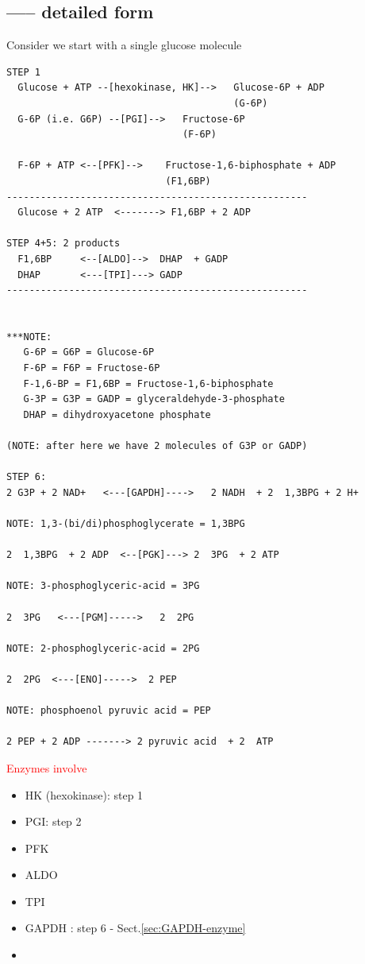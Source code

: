 

\subsection{----- detailed form}

Consider we start with a single glucose molecule

{\tiny
\begin{verbatim}
STEP 1
  Glucose + ATP --[hexokinase, HK]-->   Glucose-6P + ADP
                                        (G-6P)
  G-6P (i.e. G6P) --[PGI]-->   Fructose-6P
                               (F-6P)

  F-6P + ATP <--[PFK]-->    Fructose-1,6-biphosphate + ADP
                            (F1,6BP)
-----------------------------------------------------
  Glucose + 2 ATP  <-------> F1,6BP + 2 ADP

STEP 4+5: 2 products
  F1,6BP     <--[ALDO]-->  DHAP  + GADP
  DHAP       <---[TPI]---> GADP
-----------------------------------------------------


***NOTE:
   G-6P = G6P = Glucose-6P
   F-6P = F6P = Fructose-6P
   F-1,6-BP = F1,6BP = Fructose-1,6-biphosphate
   G-3P = G3P = GADP = glyceraldehyde-3-phosphate
   DHAP = dihydroxyacetone phosphate

(NOTE: after here we have 2 molecules of G3P or GADP)

STEP 6:
2 G3P + 2 NAD+   <---[GAPDH]---->   2 NADH  + 2  1,3BPG + 2 H+

NOTE: 1,3-(bi/di)phosphoglycerate = 1,3BPG

2  1,3BPG  + 2 ADP  <--[PGK]---> 2  3PG  + 2 ATP

NOTE: 3-phosphoglyceric-acid = 3PG

2  3PG   <---[PGM]----->   2  2PG

NOTE: 2-phosphoglyceric-acid = 2PG

2  2PG  <---[ENO]----->  2 PEP

NOTE: phosphoenol pyruvic acid = PEP

2 PEP + 2 ADP -------> 2 pyruvic acid  + 2  ATP
\end{verbatim}
}

\textcolor{red}{Enzymes involve}
\begin{itemize}
  \item HK (hexokinase): step 1
  \item PGI: step 2
  \item PFK
  \item ALDO
  \item TPI
  \item GAPDH : step 6 - Sect.\ref{sec:GAPDH-enzyme}

  \item
\end{itemize}



